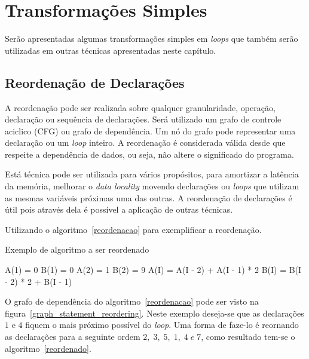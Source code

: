 
\section{Transformações Simples}

Serão apresentadas algumas transformações simples em \textit{loops} que também
serão utilizadas em outras técnicas apresentadas neste capítulo.

\subsection{Reordenação de Declarações}

A reordenação pode ser realizada sobre qualquer granularidade, operação,
declaração ou sequência de declarações. 
Será utilizado um grafo de controle aciclico (CFG) ou grafo de dependência.
Um nó do grafo pode representar uma declaração ou um \textit{loop} inteiro.
A reordenação é considerada válida desde que respeite a dependência de dados, 
ou seja, não altere o significado do programa.

Está técnica pode ser utilizada para vários propósitos, para 
amortizar a latência da memória, melhorar o \textit{data locality} movendo 
declarações ou \textit{loops} que utilizam as mesmas variáveis próximas uma das 
outras. 
A reordenação de declarações é útil pois através dela é possível 
a aplicação de outras técnicas. 

Utilizando o algoritmo~\ref{reordenacao} para exemplificar a reordenação. 

\begin{algorithm}
\caption{Exemplo de algoritmo a ser reordenado}
\label{reordenacao}
\begin{algorithmic}[1]

\STATE A(1) = 0
\STATE B(1) = 0
\STATE A(2) = 1
\STATE B(2) = 9
\ENDIF
{}
\STATE A(I) = A(I - 2) + A(I - 1) * 2
\STATE B(I) = B(I - 2) * 2 + B(I - 1) 
\ENDFOR

\end{algorithmic}
\end{algorithm}

O grafo de dependência do algoritmo~\ref{reordenacao} pode ser visto na 
figura~\ref{graph_statement_reordering}. 
Neste exemplo deseja-se que as declarações $1$ e $4$ fiquem o mais próximo 
possível do \textit{loop}. 
Uma forma de faze-lo é reornando as declarações para a seguinte ordem $2,\; 3,\; 5,
\;1,\; 4\; e\; 7$, como resultado tem-se o algoritmo~\ref{reordenado}.



